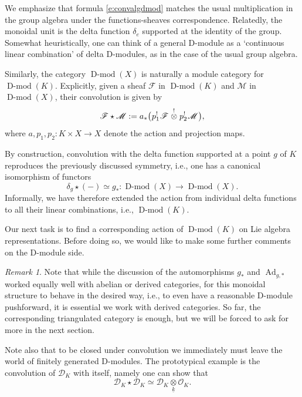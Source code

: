 \documentclass[10pt]{amsart}
\newcommand{\sM}{\mathscr{M}}
\newcommand{\on}{\operatorname}
\newcommand{\Dmod}{\on{D-mod}}
\theoremstyle{remark}
\newtheorem{re}[subsubsection]{Remark}
\newcommand{\sF}{\mathscr{F}}
\newcommand{\OO}{\mathscr{O}}
\newcommand{\sD}{\mathscr{D}}
\numberwithin{equation}{section}
\begin{document}
	We 
	emphasize that formula \eqref{e:convalgdmod} matches the usual multiplication in the group 
	algebra under the functions-sheaves correspondence. Relatedly, the monoidal 
	unit is the delta function $\delta_e$ supported at the identity of the 
	group. Somewhat heuristically, one can think of a general D-module as a 
	`continuous linear combination' of delta D-modules, as in the case of the 
	usual group algebra.
	
	
	
	
	
	
	Similarly, the category $\Dmod(X)$ is naturally a module category for 
	$\Dmod(K)$. Explicitly, given a sheaf $\sF$ in $\Dmod(K)$ and $\sM$ in 
	$\Dmod(X)$, their convolution is given by 
	\begin{equation} \label{e:conv}
	     \sF \star \sM := a_*\big( \hspace{.2mm}p_1^! \hspace{.2mm}\sF 
	     \hspace{.2mm} 
	     \overset{!}{\otimes} \hspace{.2mm} p_2^! \hspace{.2mm}
	     \sM\hspace{.2mm}\big),\end{equation}
	where $a, p_1, p_2: K \times X \rightarrow X$ denote the action and 
	projection maps. 
	
	By construction, convolution with the delta function  supported at a point 
	$g$ of $K$ reproduces 
	the previously discussed symmetry, i.e., one has a canonical isomorphism of 
	functors 
	\begin{equation}
	\label{e:action}
	 \delta_g \star (-) \simeq g_*: \Dmod(X) \rightarrow \Dmod(X). 
	\end{equation}
	Informally, we have therefore extended the action from individual delta 
	functions to all their linear combinations, i.e., $\Dmod(K)$. 
	
	
	Our next task is to find a corresponding action of $\Dmod(K)$ on Lie 
	algebra representations. Before doing so, we would like to 
 make some further comments on the D-module side. 
	
	
	
	\begin{re} Note that while the discussion of the automorphisms $g_*$ and 
	$\on{Ad}_{g, *}$ worked equally well with abelian or derived categories, 
	for this monoidal structure to behave in the desired way, i.e., to even have a reasonable D-module pushforward, it is essential we 
	work with derived categories. So far, the corresponding triangulated 
	category is enough, but we will be forced to ask for more in the next section. 
	
	Note also that to be closed under convolution we immediately must leave the 
	world of finitely generated D-modules. The prototypical example is 
	the convolution of $\sD_K$ with itself, namely one can show that
	\[
	    \sD_K \star \sD_K \simeq \sD_K \underset{\underline{k}}{\otimes} \OO_K.
	\]
	\end{re}
	
\end{document}
